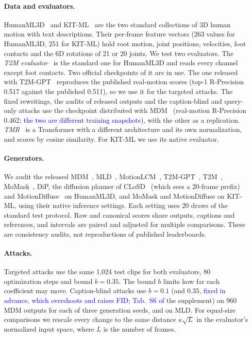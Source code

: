 \documentclass[10pt,twocolumn,letterpaper]{article}
\newcommand{\new}[1]{\textcolor{blue}{#1}}%
\begin{document}
\paragraph{Data and evaluators.}
HumanML3D~\cite{guo2022} and KIT-ML~\cite{kit2016} are the two standard collections of 3D human motion with text descriptions. Their per-frame feature vectors (263 values for HumanML3D, 251 for KIT-ML) hold root motion, joint positions, velocities, foot contacts and the 6D rotations of 21 or 20 joints. We test two evaluators. The \emph{T2M evaluator}~\cite{guo2022} is the standard one for HumanML3D and reads every channel except foot contacts. Two official checkpoints of it are in use. The one released with T2M-GPT~\cite{t2mgpt2023} reproduces the published real-motion scores (top-1 R-Precision 0.517 against the published 0.511), so we use it for the targeted attacks. The fixed rewritings, the audits of released outputs and the caption-blind and query-only attacks use the checkpoint distributed with MDM~\cite{tevet2023} (real-motion R-Precision 0.462\new{; the two are different training snapshots}), with the other as a replication. \emph{TMR}~\cite{tmr2023} is a Transformer with a different architecture and its own normalization, and scores by cosine similarity. For KIT-ML we use its native evaluator.

\paragraph{Generators.}
We audit the released MDM~\cite{tevet2023}, MLD~\cite{mld2023}, MotionLCM~\cite{motionlcm2024}, T2M-GPT~\cite{t2mgpt2023}, T2M~\cite{guo2022}, MoMask~\cite{momask2024}, DiP, the diffusion planner of CLoSD~\cite{closd2025} (which sees a 20-frame prefix) and MotionDiffuse~\cite{motiondiffuse2024} on HumanML3D, and MoMask and MotionDiffuse on KIT-ML, using their native inference settings. Each setting uses 20 draws of the standard test protocol. Raw and canonical scores share outputs, captions and references, and intervals are paired and adjusted for multiple comparisons. These are consistency audits, not reproductions of published leaderboards.

\paragraph{Attacks.}
Targeted attacks use the same 1,024 test clips for both evaluators, 80 optimization steps and bound $b=0.35$. The bound $b$ limits how far each coefficient may move. Caption-blind attacks use $b=0.1$ (and $0.35$, \new{fixed in advance, which overshoots and raises FID;} \new{Tab.~S6 of} the supplement) on 960 MDM outputs for each of three generation seeds, and on MLD. For equal-size comparisons we rescale every change to the same distance $\kappa\sqrt{L}$ in the evaluator's normalized input space, where $L$ is the number of frames.
\end{document}
